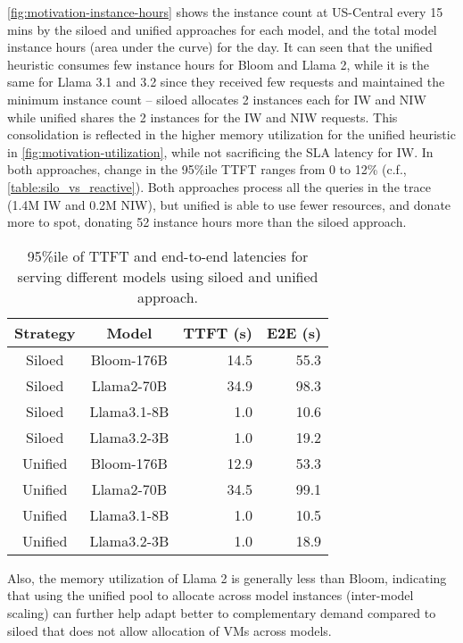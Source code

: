 \autoref{fig:motivation-instance-hours} shows the instance count at US-Central every 15 mins by the siloed and unified approaches for each model, and the total model instance hours (area under the curve) for the day. 
It can seen that the unified heuristic consumes few instance hours for Bloom and Llama 2, while it is the same for Llama 3.1 and 3.2 since they received few requests and maintained the minimum instance count -- siloed allocates 2 instances each for IW and NIW while unified shares the 2 instances for the IW and NIW requests. This consolidation is reflected in the higher memory utilization for the unified heuristic in \autoref{fig:motivation-utilization}, while not sacrificing the SLA latency for IW.
In both approaches, change in the 95$\%$ile TTFT ranges from 0 to 12\% (c.f., \autoref{table:silo_vs_reactive}). 
Both approaches process all the queries in the trace (1.4M IW and 0.2M NIW),
but unified is able to use fewer resources, and donate more to spot, donating 52 instance hours more than the siloed approach.
\begin{table}[t]
    \centering
    \caption{95\%ile of TTFT and end-to-end latencies for serving different models using siloed and unified approach. 
    }
    \label{table:silo_vs_reactive}
    \begin{tabular}{c|c|r|r}
    \hline
        \textbf{Strategy} & \textbf{Model} & \textbf{TTFT (s)} & \textbf{E2E (s)} \\ \hline\hline
        Siloed & Bloom-176B & 14.5 & 55.3 \\ \hline
        Siloed & Llama2-70B & 34.9 & 98.3 \\ \hline
        Siloed & Llama3.1-8B & 1.0 & 10.6 \\ \hline
        Siloed & Llama3.2-3B & 1.0 & 19.2 \\ \hline
        Unified & Bloom-176B & 12.9 & 53.3 \\ \hline
        Unified & Llama2-70B & 34.5 & 99.1 \\ \hline
        Unified & Llama3.1-8B & 1.0 & 10.5 \\ \hline
        Unified & Llama3.2-3B & 1.0 & 18.9 \\ \hline
    \end{tabular}
\end{table}
Also, the memory utilization of Llama 2 is generally less than Bloom, indicating that using the unified pool to allocate across model instances (inter-model scaling) can further help adapt better to complementary demand compared to siloed that does not allow allocation of VMs across models. 

